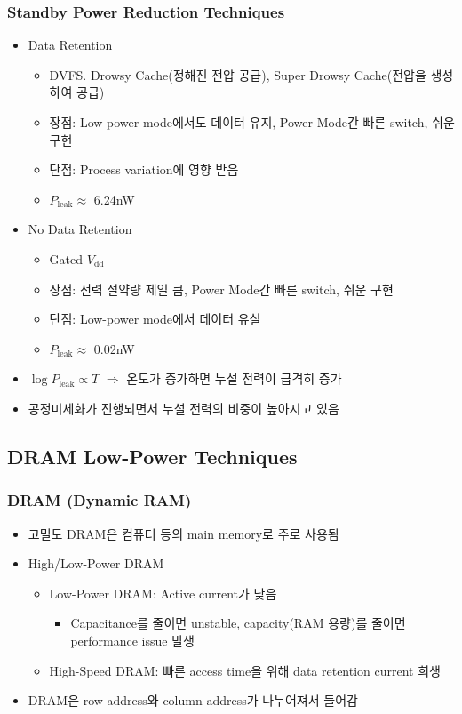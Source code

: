\subsubsection*{Standby Power Reduction Techniques}
\begin{itemize}
    \item Data Retention
    \begin{itemize}
        \item DVFS. Drowsy Cache(정해진 전압 공급), Super Drowsy Cache(전압을 생성하여 공급)
        \item 장점: Low-power mode에서도 데이터 유지, Power Mode간 빠른 switch, 쉬운 구현
        \item 단점: Process variation에 영향 받음
        \item $P_{\mathrm{leak}} \approx$ 6.24nW
    \end{itemize}
    \item No Data Retention
    \begin{itemize}
        \item Gated $V_{\mathrm{dd}}$
        \item 장점: 전력 절약량 제일 큼, Power Mode간 빠른 switch, 쉬운 구현
        \item 단점: Low-power mode에서 데이터 유실
        \item $P_{\mathrm{leak}} \approx$ 0.02nW
    \end{itemize}
    \item $\log P_{\mathrm{leak}} \varpropto T$ $\Rightarrow$ 온도가 증가하면 누설 전력이 급격히 증가
    \item 공정미세화가 진행되면서 누설 전력의 비중이 높아지고 있음
\end{itemize}

\subsection{DRAM Low-Power Techniques}

\subsubsection*{DRAM (Dynamic RAM)}
\begin{itemize}
    \item 고밀도 DRAM은 컴퓨터 등의 main memory로 주로 사용됨
    \item High/Low-Power DRAM
    \begin{itemize}
        \item Low-Power DRAM: Active current가 낮음
        \begin{itemize}
            \item Capacitance를 줄이면 unstable, capacity(RAM 용량)를 줄이면 performance issue 발생
        \end{itemize}
        \item High-Speed DRAM: 빠른 access time을 위해 data retention current 희생
    \end{itemize}
    \item DRAM은 row address와 column address가 나누어져서 들어감
\end{itemize}


